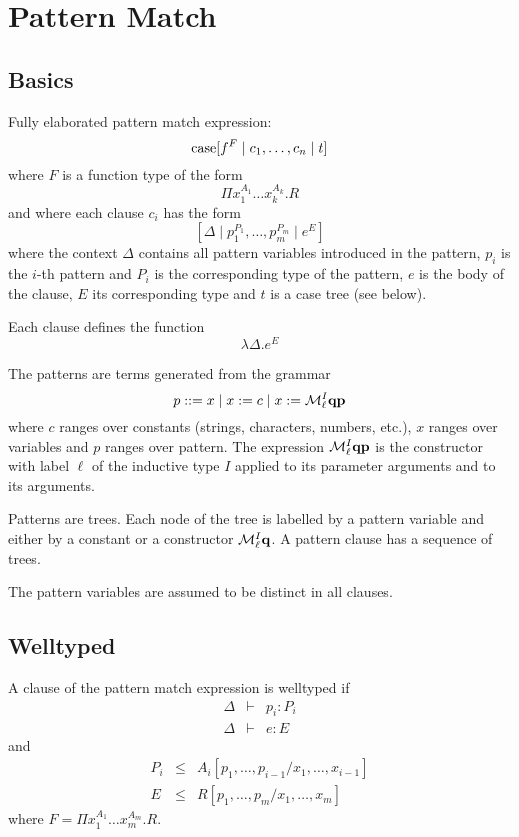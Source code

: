 \section{Pattern Match}

\subsection{Basics}

Fully elaborated pattern match expression:
$$
{\text{case}}[ f^F \mid c_1,  \ldots, c_n \mid t]
$$
%
where $F$ is a function type of the form
%
$$
\Pi x_1^{A_1} \ldots x_k^{A_k}. R
$$
%
and where each clause $c_i$ has the form
%
$$
    [\Delta \mid p_1^{P_1}, \ldots, p_m^{P_m} \mid e^E]
$$
where the context $\Delta$ contains all pattern variables introduced in the
pattern, $p_i$ is the $i$-th pattern
and $P_i$ is the corresponding type of the pattern, $e$ is the body of the
clause, $E$ its corresponding type and $t$ is a case tree (see below).

Each clause defines the function
$$
\lambda \Delta . e^E
$$


The patterns are terms generated from the grammar
$$
    p ::= x \mid x := c \mid x := {\cal M}^I_\ell {\mathbf q} {\mathbf p}
$$
where $c$ ranges over constants (strings, characters, numbers, etc.), $x$ ranges
over variables and $p$ ranges over pattern. The expression ${\cal M}^I_\ell {\mathbf q}
{\mathbf p}$ is the constructor with label $\ell$ of the inductive type $I$ applied to its
parameter arguments and to its arguments.

Patterns are trees. Each node of the tree is labelled by a pattern variable and
either by a constant or a constructor ${\cal M}^I_\ell {\mathbf q}$. A pattern clause has a
sequence of trees.

The pattern variables are assumed to be distinct in all clauses.



\subsection{Welltyped}

A clause of the pattern match expression is welltyped if
$$
\begin{array}{lll}
    \Delta &\vdash& p_i : P_i
    \\
    \Delta &\vdash& e : E
\end{array}
$$
%
and
%
$$
\begin{array}{lll}
    P_i &\le& A_i[p_1,\ldots,p_{i-1} / x_1,\ldots,x_{i-1}]
    \\
    E   &\le& R[p_1,\ldots,p_m / x_1,\ldots,x_m]
\end{array}
$$
%
where $F = \Pi x_1^{A_1} \ldots x_m^{A_m}. R$.




